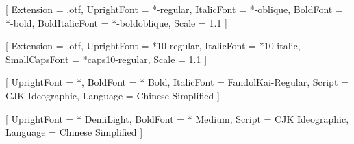 





\setsansfont{lmsans10}[
  Extension         = .otf,
  UprightFont       = *-regular,
  ItalicFont        = *-oblique,
  BoldFont          = *-bold,
  BoldItalicFont    = *-boldoblique,
  Scale             = 1.1
]



\setmonofont{lmmono}[
  Extension         = .otf,
  UprightFont       = *10-regular,
  ItalicFont        = *10-italic,
  SmallCapsFont     = *caps10-regular,
  Scale             = 1.1
]

[
  UprightFont       = *,
  BoldFont          = * Bold,
  ItalicFont        = FandolKai-Regular,
  Script            = CJK Ideographic,
  Language          = Chinese Simplified
]


[
  UprightFont       = * DemiLight,
  BoldFont          = * Medium,
  Script            = CJK Ideographic,
  Language          = Chinese Simplified
]

